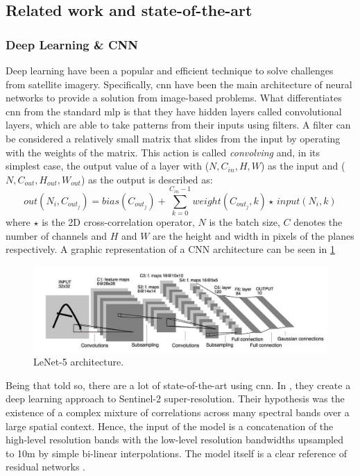 \documentclass[11pt, a4paper]{article}
\begin{document}
	\subsection{Related work and state-of-the-art}
	\subsubsection{Deep Learning \& CNN}
	Deep learning have been a popular and efficient technique to solve challenges from satellite imagery. Specifically, \gls{cnn} have been the main architecture of neural networks to provide a solution from image-based problems. What differentiates \gls{cnn} from the standard \gls{mlp} is that they have hidden layers called convolutional layers, which are able to take patterns from their inputs using filters. A filter can be considered a relatively small matrix that slides from the input by operating with the weights of the matrix. This action is called \textit{convolving }and, in its simplest case, the output value of a layer with ($N, C_{in}, H, W$) as the input and ($N, C_{out}, H_{out}, W_{out}$) as the output is described as:
	\[out(N_i, C_{out_j}) = bias(C_{out_j}) + \sum_{k=0}^{C_{in} - 1} weight(C_{out_j}, k) \star \, input(N_i, k)\]
	where $\star$ is the 2D cross-correlation operator, $N$ is the batch size, $C$ denotes the number of channels and $H$ and $W$ are the height and width in pixels of the planes respectively. A graphic representation of a CNN architecture can be seen in \ref{fig:related-lenet}
	\begin{figure}[H]
		\centering
		\includegraphics[width=14cm]{imgs/relatedwork/lenet-5.jpeg}
		\caption{LeNet-5 architecture.}
		\label{fig:related-lenet}
	\end{figure}
	Being that told so, there are a lot of state-of-the-art using \gls{cnn}. In \cite{LANARAS2018305}, they create a deep learning approach to Sentinel-2 super-resolution. Their hypothesis was the existence of a complex mixture of correlations across many spectral bands over a large spatial context. Hence, the input of the model is a concatenation of the high-level resolution bands with the low-level resolution bandwidths upsampled to 10m by simple bi-linear interpolations. The model itself is a clear reference of residual networks \cite{he2016deep}.
\end{document}
